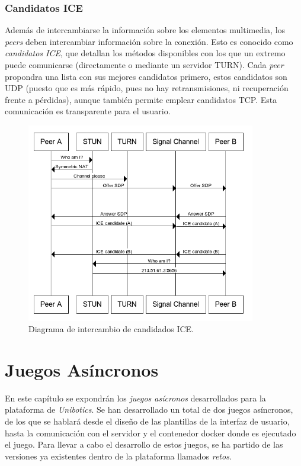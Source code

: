 \documentclass[a4paper, 12pt]{book}
\begin{document}
\subsection{Candidatos ICE}
\label{subsec:candidatos_ice}

Además de intercambiarse la información sobre los elementos multimedia, los \textit{peers} deben intercambiar información sobre la conexión. Esto es conocido como \textit{candidatos ICE}, que detallan los métodos disponibles con los que un extremo puede comunicarse (directamente o mediante un servidor TURN). Cada \textit{peer} propondra una lista con sus mejores candidatos primero, estos candidatos son UDP (puesto que es más rápido, pues no hay retransmisiones, ni recuperación frente a pérdidas), aunque también permite emplear candidatos TCP. Esta comunicación es transparente para el usuario.

\begin{figure}[H]
	\centering
    \includegraphics[width=10cm]{img/ice_diagram.png}
    \caption{Diagrama de intercambio de candidados ICE.}
    \label{figura:nocss_vs_css}
\end{figure}


\cleardoublepage
\chapter{Juegos Asíncronos}

En este capítulo se expondrán los \emph{juegos asícronos} desarrollados para la plataforma de \textit{Unibotics}. Se han desarrollado un total de dos juegos asíncronos, de los que se hablará desde el diseño de las plantillas de la interfaz de usuario, hasta la comunicación con el servidor y el contenedor docker donde es ejecutado el juego. Para llevar a cabo el desarrollo de estos juegos, se ha partido de las versiones ya existentes dentro de la plataforma llamados \emph{retos}.
\end{document}
